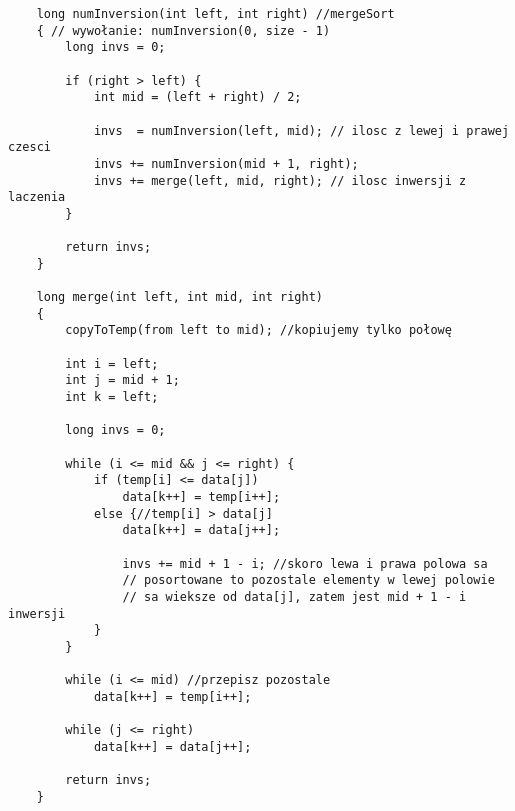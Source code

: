 \documentclass[../algorytmy.tex]{subfiles}
\begin{document}
    \begin{verbatim}
    long numInversion(int left, int right) //mergeSort
    { // wywołanie: numInversion(0, size - 1)
        long invs = 0;

        if (right > left) {
            int mid = (left + right) / 2;

            invs  = numInversion(left, mid); // ilosc z lewej i prawej czesci
            invs += numInversion(mid + 1, right);
            invs += merge(left, mid, right); // ilosc inwersji z laczenia
        }

        return invs;
    }

    long merge(int left, int mid, int right)
    {
        copyToTemp(from left to mid); //kopiujemy tylko połowę

        int i = left;
        int j = mid + 1;
        int k = left;

        long invs = 0;

        while (i <= mid && j <= right) {
            if (temp[i] <= data[j])
                data[k++] = temp[i++];
            else {//temp[i] > data[j]
                data[k++] = data[j++];

                invs += mid + 1 - i; //skoro lewa i prawa polowa sa
                // posortowane to pozostale elementy w lewej polowie
                // sa wieksze od data[j], zatem jest mid + 1 - i inwersji
            }
        }

        while (i <= mid) //przepisz pozostale
            data[k++] = temp[i++];

        while (j <= right)
            data[k++] = data[j++];

        return invs;
    }
    \end{verbatim}
\end{document}
